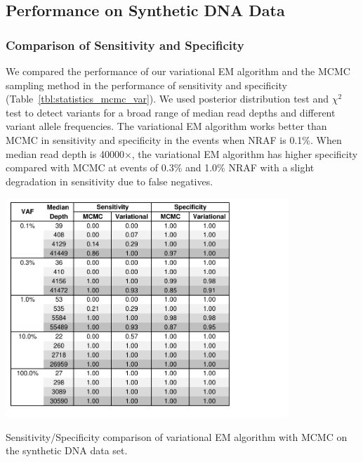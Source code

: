 \documentclass[11pt,reqno]{amsart}
\begin{document}
\subsection{Performance on Synthetic DNA Data}
\subsubsection{Comparison of Sensitivity and Specificity}
We compared the performance of our variational EM algorithm and the MCMC sampling method in the performance of sensitivity and specificity (Table~\ref{tbl:statistics_mcmc_var}).
We used posterior distribution test and $\chi^2$ test to detect variants for a broad range of median read depths and different variant allele frequencies.
The variational EM algorithm works better than MCMC in sensitivity and specificity in the events when NRAF is 0.1\%.
When median read depth is 40000$\times$, the variational EM algorithm has higher specificity compared with MCMC at events of 0.3\% and 1.0\% NRAF with a slight degradation in sensitivity due to false negatives.
\begin{table}[h]
\centering
\includegraphics[width=0.8\textwidth]{tables/statistics_mcmc_var.pdf}
\caption{Sensitivity/Specificity comparison of variational EM algorithm with MCMC on the synthetic DNA data set.}
\label{tbl:statistics_mcmc_var}
\end{table}
\end{document}
